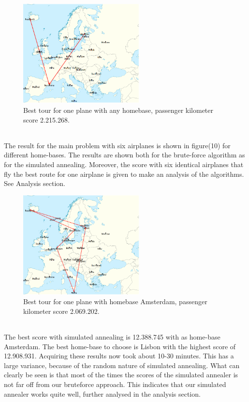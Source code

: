 \documentclass[journal]{IEEEtran}
\begin{document}
\\
\begin{figure}[!h]
\centering
\includegraphics[width=2.5in]{best_tour_one_plane}
\caption{Best tour for one plane with any homebase, passenger kilometer score 2.215.268.}
\label{fig:one_plane}
\end{figure}
\\
The result for the main problem with six airplanes is shown in figure(10) for different home-bases. The results are shown both for the brute-force algorithm as for the simulated annealing. Moreover, the score with six identical airplanes that fly the best route for one airplane is given to make an analysis of the algorithms. See Analysis section. 
\\
\begin{figure}[!h]
\centering
\includegraphics[width=2.5in]{best_tour_one_plane_amsterdam}
\caption{Best tour for one plane with homebase Amsterdam, passenger kilometer score 2.069.202.}
\label{fig:one_plane_amsterdam}
\end{figure}
\\
The best score with simulated annealing is 12.388.745 with as home-base Amsterdam. The best home-base to choose is Lisbon with the highest score of 12.908.931.  Acquiring these results now took about 10-30 minutes. This has a large variance, because of the random nature of simulated annealing.  What can clearly be seen is that most of the times the scores of the simulated annealer is not far off from our bruteforce approach. This indicates that our simulated annealer works quite well, further analysed in the analysis section.
\end{document}
